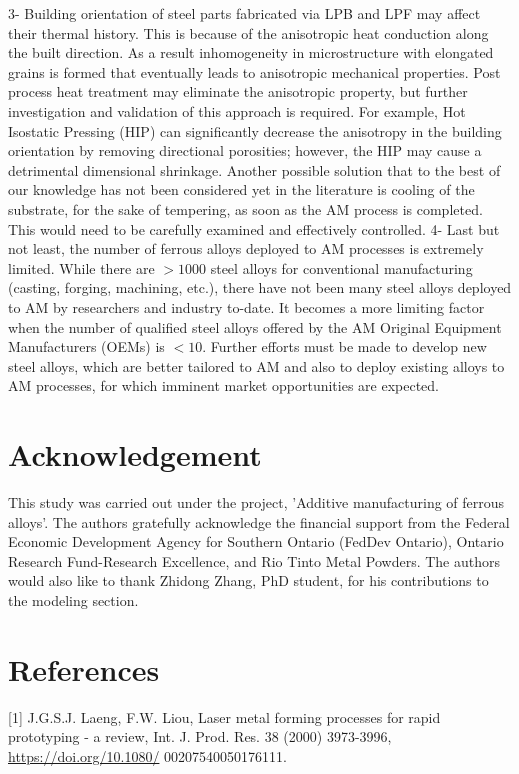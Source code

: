 \documentclass[10pt]{article}
\begin{document}
3- Building orientation of steel parts fabricated via LPB and LPF may affect their thermal history. This is because of the anisotropic heat conduction along the built direction. As a result inhomogeneity in microstructure with elongated grains is formed that eventually leads to anisotropic mechanical properties. Post process heat treatment may eliminate the anisotropic property, but further investigation and validation of this approach is required. For example, Hot Isostatic Pressing (HIP) can significantly decrease the anisotropy in the building orientation by removing directional porosities; however, the HIP may cause a detrimental dimensional shrinkage. Another possible solution that to the best of our knowledge has not been considered yet in the literature is cooling of the substrate, for the sake of tempering, as soon as the AM process is completed. This would need to be carefully examined and effectively controlled. 4- Last but not least, the number of ferrous alloys deployed to AM processes is extremely limited. While there are $>1000$ steel alloys for conventional manufacturing (casting, forging, machining, etc.), there have not been many steel alloys deployed to AM by researchers and industry to-date. It becomes a more limiting factor when the number of qualified steel alloys offered by the AM Original Equipment Manufacturers (OEMs) is $<10$. Further efforts must be made to develop new steel alloys, which are better tailored to AM and also to deploy existing alloys to AM processes, for which imminent market opportunities are expected.

\section*{Acknowledgement}
This study was carried out under the project, 'Additive manufacturing of ferrous alloys'. The authors gratefully acknowledge the financial support from the Federal Economic Development Agency for Southern Ontario (FedDev Ontario), Ontario Research Fund-Research Excellence, and Rio Tinto Metal Powders. The authors would also like to thank Zhidong Zhang, PhD student, for his contributions to the modeling section.

\section*{References}
[1] J.G.S.J. Laeng, F.W. Liou, Laser metal forming processes for rapid prototyping - a review, Int. J. Prod. Res. 38 (2000) 3973-3996, \href{https://doi.org/10.1080/}{https://doi.org/10.1080/} 00207540050176111.
\end{document}
